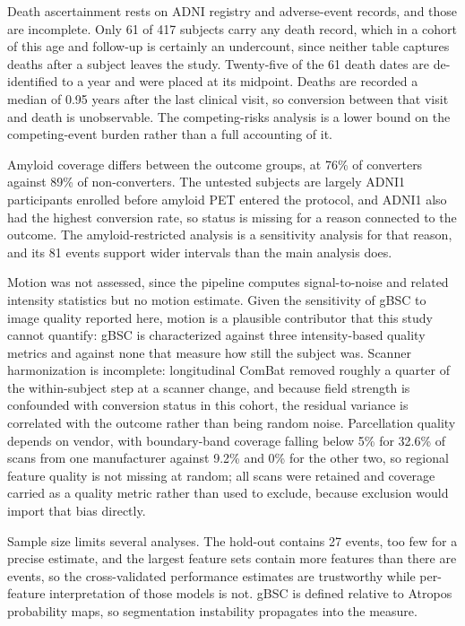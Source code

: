 \documentclass[blue]{ludusofficial}  %
\begin{document}
Death ascertainment rests on ADNI registry and adverse-event records, and those are incomplete. Only 61 of 417 subjects carry any death record, which in a cohort of this age and follow-up is certainly an undercount, since neither table captures deaths after a subject leaves the study. Twenty-five of the 61 death dates are de-identified to a year and were placed at its midpoint. Deaths are recorded a median of 0.95 years after the last clinical visit, so conversion between that visit and death is unobservable. The competing-risks analysis is a lower bound on the competing-event burden rather than a full accounting of it.

Amyloid coverage differs between the outcome groups, at 76\% of converters against 89\% of non-converters. The untested subjects are largely ADNI1 participants enrolled before amyloid PET entered the protocol, and ADNI1 also had the highest conversion rate, so status is missing for a reason connected to the outcome. The amyloid-restricted analysis is a sensitivity analysis for that reason, and its 81 events support wider intervals than the main analysis does.

Motion was not assessed, since the pipeline computes signal-to-noise and related intensity statistics but no motion estimate. Given the sensitivity of gBSC to image quality reported here, motion is a plausible contributor that this study cannot quantify: gBSC is characterized against three intensity-based quality metrics and against none that measure how still the subject was. Scanner harmonization is incomplete: longitudinal ComBat removed roughly a quarter of the within-subject step at a scanner change, and because field strength is confounded with conversion status in this cohort, the residual variance is correlated with the outcome rather than being random noise. Parcellation quality depends on vendor, with boundary-band coverage falling below 5\% for 32.6\% of scans from one manufacturer against 9.2\% and 0\% for the other two, so regional feature quality is not missing at random; all scans were retained and coverage carried as a quality metric rather than used to exclude, because exclusion would import that bias directly.

Sample size limits several analyses. The hold-out contains 27 events, too few for a precise estimate, and the largest feature sets contain more features than there are events, so the cross-validated performance estimates are trustworthy while per-feature interpretation of those models is not. gBSC is defined relative to Atropos probability maps, so segmentation instability propagates into the measure.
\end{document}
